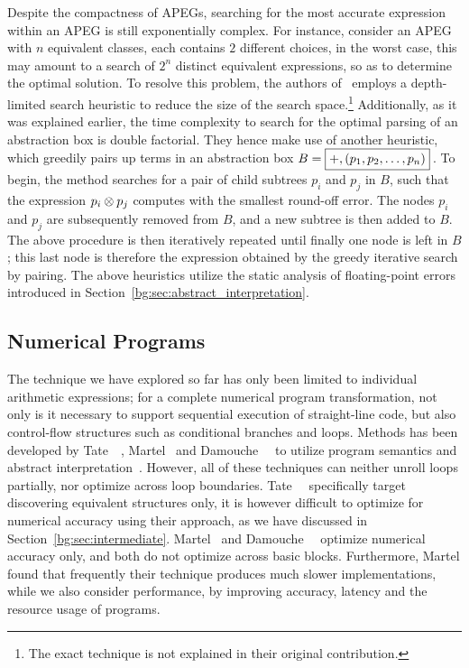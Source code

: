 Despite the compactness of APEGs, searching for the most accurate expression
within an APEG is still exponentially complex.  For instance, consider an APEG
with $n$ equivalent classes, each contains $2$ different choices, in the worst
case, this may amount to a search of $2^n$ distinct equivalent expressions, so
as to determine the optimal solution.  To resolve this problem, the authors
of~\cite{ioualalen} employs a depth-limited search heuristic to reduce the size
of the search space.\footnote{The exact technique is not explained in their
original contribution.}  Additionally, as it was explained earlier, the time
complexity to search for the optimal parsing of an abstraction box is double
factorial.  They hence make use of another heuristic, which greedily pairs up
terms in an abstraction box $B = \text{\fbox{$+, \left(p_1, p_2, \mathellipsis,
p_n\right)$}}$\,.  To begin, the method searches for a pair of child subtrees
$p_i$ and $p_j$ in $B$, such that the expression $p_i \otimes p_j$ computes
with the smallest round-off error.  The nodes $p_i$ and $p_j$ are subsequently
removed from $B$, and a new subtree
is then added to $B$.  The above procedure is then iteratively repeated
until finally one node is left in $B$; this last node is therefore the
expression obtained by the greedy iterative search by pairing.  The above
heuristics utilize the static analysis of floating-point errors introduced in
Section~\ref{bg:sec:abstract_interpretation}.


\subsection{Numerical Programs}
\label{bg:sub:numerical_programs}

The technique we have explored so far has only been limited to individual
arithmetic expressions; for a complete numerical program transformation, not
only is it necessary to support sequential execution of straight-line code,
but also control-flow structures such as conditional branches and loops.
Methods has been developed by Tate~\etal~\cite{tate09}, Martel~\cite{martel09}
and Damouche~\etal~\cite{damouche15} to utilize program semantics and
abstract interpretation~\cite{cousot77}.  However, all of these techniques
can neither unroll loops partially, nor optimize across loop boundaries.
Tate~\etal~\cite{tate09} specifically target discovering equivalent structures
only, it is however difficult to optimize for numerical accuracy using
their approach, as we have discussed in Section~\ref{bg:sec:intermediate}.
Martel~\cite{martel09} and Damouche~\etal~\cite{damouche15} optimize
numerical accuracy only, and both do not optimize across basic blocks.
Furthermore, Martel found that frequently their technique produces much slower
implementations,  while we also consider performance, by
improving accuracy, latency and the resource usage of programs.


